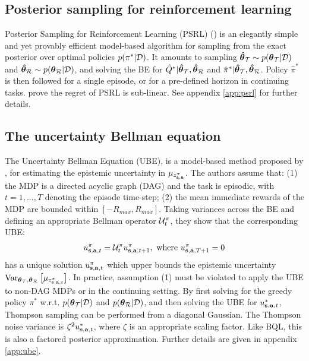 \documentclass{article}
\begin{document}
\subsection{Posterior sampling for reinforcement learning}

Posterior Sampling for Reinforcement Learning (PSRL) (\cite{psrl}) is an elegantly simple and yet provably efficient model-based algorithm for sampling from the exact posterior over optimal policies $p(\pi^* | \mathcal{D})$. It amounts to sampling $\boldsymbol{\hat{\theta}}_{\mathcal{T}} \sim p(\boldsymbol{\theta}_{\mathcal{T}} | \mathcal{D})$ and $\boldsymbol{\hat{\theta}}_{\mathcal{R}} \sim p(\boldsymbol{\theta}_{\mathcal{R}} | \mathcal{D})$, and solving the BE for $\hat{Q}^* | \boldsymbol{\hat{\theta}}_{\mathcal{T}}, \boldsymbol{\hat{\theta}}_{\mathcal{R}} $ and $\hat{\pi}^* | \boldsymbol{\hat{\theta}}_{\mathcal{T}}, \boldsymbol{\hat{\theta}}_{\mathcal{R}}$. Policy $\hat{\pi}^*$ is then followed for a single episode, or for a pre-defined horizon in continuing tasks. \cite{psrl} prove the regret of PSRL is sub-linear. See appendix \ref{app:psrl} for further details.

\subsection{The uncertainty Bellman equation}
The Uncertainty Bellman Equation (UBE), is a model-based method proposed by \cite{ube}, for estimating the epistemic uncertainty in $\mu_{z^\pi_{\mathbf{s}, \mathbf{a}}}$. The authors assume that: (1) the MDP is a directed acyclic graph (DAG) and the task is episodic, with $t = 1, ..., T$ denoting the episode time-step; (2) the mean immediate rewards of the MDP are bounded within $[-R_{max}, R_{max}]$. Taking variances across the BE and defining an appropriate Bellman operator $\mathcal{U}^\pi_t$, they show that the corresponding UBE:
\begin{gather*}
u_{\mathbf{s}, \mathbf{a}, t}^\pi = \mathcal{U}^\pi_{t} u_{\mathbf{s}, \mathbf{a}, t + 1}^\pi,\text{ where } u_{\mathbf{s}, \mathbf{a}, T + 1}^\pi = 0
\end{gather*}
has a unique solution $u_{\mathbf{s}, \mathbf{a}, t}^\pi$ which upper bounds the epistemic uncertainty $\operatorname{\text{Var}}_{\boldsymbol{\theta}_{\mathcal{T}}, \boldsymbol{\theta}_{\mathcal{R}}} \big[ \mu_{z^{\pi}_{\mathbf{s}, \mathbf{a}, t}} \big]$. In practice, assumption (1) must be violated to apply the UBE to non-DAG MDPs or in the continuing setting. By first solving for the greedy policy ${\pi^*}$ w.r.t. $p(\boldsymbol{\theta}_{\mathcal{T}} | \mathcal{D})$ and $p(\boldsymbol{\theta}_{\mathcal{R}} | \mathcal{D})$, and then solving the UBE for $u_{\mathbf{s}, \mathbf{a}, t}^{*}$, Thompson sampling can be performed from a diagonal Gaussian. The Thompson noise variance is $\zeta^2 u_{\mathbf{s}, \mathbf{a}, t}^{*}$, where $\zeta$ is an appropriate scaling factor. Like BQL, this is also a factored posterior approximation. Further details are given in appendix \ref{app:ube}.
\end{document}

